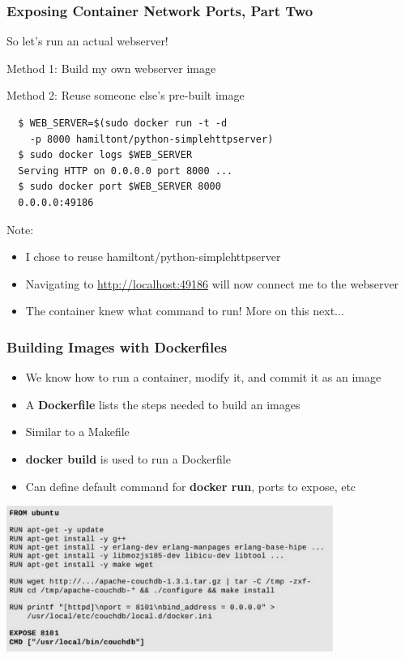 \documentclass[xcolor=dvipsnames]{beamer}
\newcommand{\cpause}{}
\begin{document}
\begin{frame}[fragile]
 \frametitle{Exposing Container Network Ports, Part Two}

  So let's run an actual webserver! \cpause
  
    Method 1: Build my own webserver image
  
    Method 2: Reuse someone else's pre-built image
  \cpause 

  \begin{lstlisting}
  $ WEB_SERVER=$(sudo docker run -t -d 
    -p 8000 hamiltont/python-simplehttpserver)
  $ sudo docker logs $WEB_SERVER
  Serving HTTP on 0.0.0.0 port 8000 ...
  $ sudo docker port $WEB_SERVER 8000
  0.0.0.0:49186
  \end{lstlisting}

  Note: 
  \begin{itemize}
  \item I chose to reuse hamiltont/python-simplehttpserver \cpause
  \item Navigating to \url{http://localhost:49186} will now connect me to the webserver
  \cpause
  \item The container knew what command to run! More on this next...
  \end{itemize}

\end{frame}

\begin{frame}[fragile]
  \frametitle{Building Images with Dockerfiles}

  
  \begin{itemize}
  \item We know how to run a container, modify it, and commit it as an image \cpause
  \item A \textbf{Dockerfile} lists the steps needed to build an images \cpause
  \item Similar to a Makefile \cpause
  \item \textbf{docker build} is used to run a Dockerfile \cpause
  \item Can define default command for \textbf{docker run}, ports to expose, etc
        \cpause
  \end{itemize}

  \centering
  \includegraphics[width=0.8\textwidth]{figures/dockerfile.pdf}
  
\end{frame}
\end{document}
